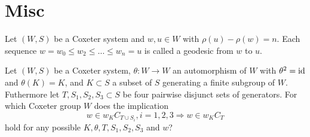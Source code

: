 \section{Misc}

\begin{defi}[Geodesic]
Let $(W,S)$ be a Coxeter system and $w,u \in W$ with $\rho(u) - \rho(w) = n$.
Each sequence $w = w_0 \leq w_2 \leq \ldots \leq w_n = u$ is called a geodesic
from $w$ to $u$.
\end{defi}

\begin{ques}
\label{ques:main}
Let $(W,S)$ be a Coxeter system, $\theta : W \to W$ an automorphism of $W$ with
$\theta^2 = \operatorname{id}$ and $\theta(K) = K$, and $K \subset S$ a subset of $S$ generating
a finite subgroup of $W$. Futhermore let $T,S_1,S_2,S_3 \subset S$ be four pairwise
disjunct sets of generators. For which Coxeter group $W$ does the implication
\begin{equation}
\label{equ:main}
w \in w_K C_{T \cup S_i}, i=1,2,3 \Rightarrow w \in w_K C_T
\end{equation}
hold for any possible $K,\theta,T,S_1,S_2,S_3$ and $w$?
\end{ques}

